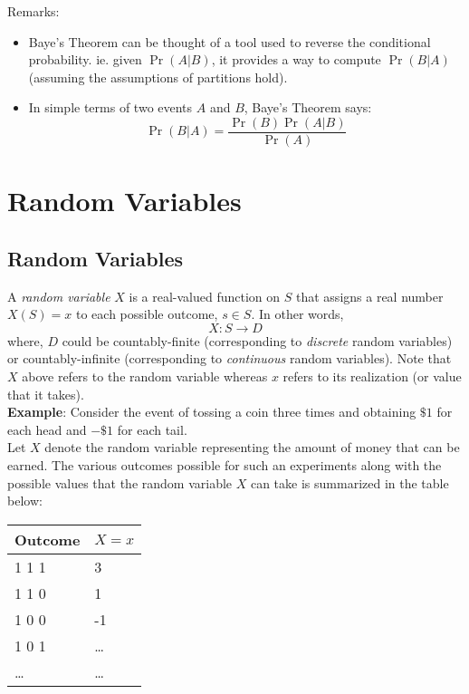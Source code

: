 \documentclass[english, 11pt]{article}
\begin{document}
Remarks:
\begin{itemize}
\item Baye's Theorem can be thought of a tool used to reverse the conditional probability. ie. given $\Pr(A | B)$, it provides a way to compute $\Pr(B | A)$ (assuming the assumptions of partitions hold).
\item In simple terms of two events $A$ and $B$, Baye's Theorem says:
\[ \Pr(B | A) = \frac{\Pr(B) \Pr(A | B)}{\Pr(A)} \]
\end{itemize}

\newpage

\section{Random Variables}
\subsection{Random Variables}
A {\it random variable} $X$ is a real-valued function on $S$ that assigns a real number $X(S) = x$ to each possible outcome, $s \in S$. In other words,
\[ X: S \rightarrow D \]
where, $D$ could be countably-finite (corresponding to {\it discrete} random variables) or countably-infinite (corresponding to {\it continuous} random variables).
Note that $X$ above refers to the random variable whereas $x$ refers to its realization (or value that it takes).\\

{\bf Example}: Consider the event of tossing a coin three times and obtaining $\$1$ for each head and $-\$1$ for each tail.\\
Let $X$ denote the random variable representing the amount of money that can be earned. The various outcomes possible for such an experiments along with the possible values that the random variable $X$ can take is summarized in the table below: \\

\begin{center}
    \begin{tabular}{| l | l |}
    \hline
    Outcome & $X=x$ \\ \hline
    1 1 1 & 3 \\ \hline
    1 1 0 & 1 \\ \hline
    1 0 0 & -1 \\ \hline
    1 0 1 & \ldots \\ \hline
    \ldots & \ldots \\
    \hline
    \end{tabular}
\end{center}
\end{document}
